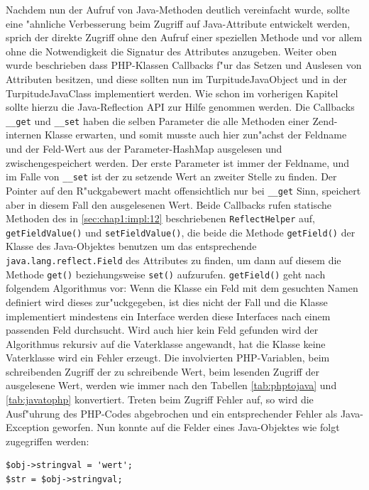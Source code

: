 Nachdem nun der Aufruf von Java-Methoden deutlich vereinfacht wurde, sollte eine "ahnliche Verbesserung beim Zugriff auf Java-Attribute
entwickelt werden, sprich der direkte Zugriff ohne den Aufruf einer speziellen Methode und vor allem ohne die Notwendigkeit die
Signatur des Attributes anzugeben. Weiter oben wurde beschrieben dass PHP-Klassen Callbacks f"ur das Setzen und Auslesen von 
Attributen besitzen, und diese sollten nun im TurpitudeJavaObject und in der TurpitudeJavaClass implementiert werden. Wie schon
im vorherigen Kapitel sollte hierzu die Java-Reflection API zur Hilfe genommen werden. Die Callbacks \texttt{\_\_get} und \texttt{\_\_set}
haben die selben Parameter die alle Methoden einer Zend-internen Klasse erwarten, und somit musste auch hier zun"achst der Feldname
und der Feld-Wert aus der Parameter-HashMap ausgelesen und zwischengespeichert werden. Der erste Parameter ist immer der Feldname,
und im Falle von \texttt{\_\_set} ist der zu setzende Wert an zweiter Stelle zu finden. Der Pointer auf den R"uckgabewert macht 
offensichtlich nur bei \texttt{\_\_get} Sinn, speichert aber in diesem Fall den ausgelesenen Wert. Beide Callbacks rufen statische Methoden
des in \ref{sec:chap1:impl:12} beschriebenen \texttt{ReflectHelper} auf, \texttt{getFieldValue()} und \texttt{setFieldValue()}, die beide
die Methode \texttt{getField()} der Klasse des Java-Objektes benutzen um das entsprechende \texttt{java.lang.reflect.Field} des Attributes 
zu finden, um dann auf diesem die Methode \texttt{get()} beziehungsweise \texttt{set()} aufzurufen. \texttt{getField()} geht nach folgendem
Algorithmus vor: Wenn die Klasse ein Feld mit dem gesuchten Namen definiert wird dieses zur"uckgegeben, ist dies nicht der Fall und die
Klasse implementiert mindestens ein Interface werden diese Interfaces nach einem passenden Feld durchsucht. Wird auch hier kein Feld
gefunden wird der Algorithmus rekursiv auf die Vaterklasse angewandt, hat die Klasse keine Vaterklasse wird ein Fehler erzeugt.
Die involvierten PHP-Variablen, beim
schreibenden Zugriff der zu schreibende Wert, beim lesenden Zugriff der ausgelesene Wert, werden wie immer nach den Tabellen
\ref{tab:phptojava} und \ref{tab:javatophp} konvertiert. Treten beim Zugriff Fehler auf, so wird die Ausf"uhrung des PHP-Codes abgebrochen
und ein entsprechender Fehler als Java-Exception geworfen. Nun konnte auf die Felder eines Java-Objektes wie folgt zugegriffen werden:
\begin{lstlisting}[caption=Verbesserter Zugriff auf Java-Attribute]
$obj->stringval = 'wert';
$str = $obj->stringval;
\end{lstlisting}
